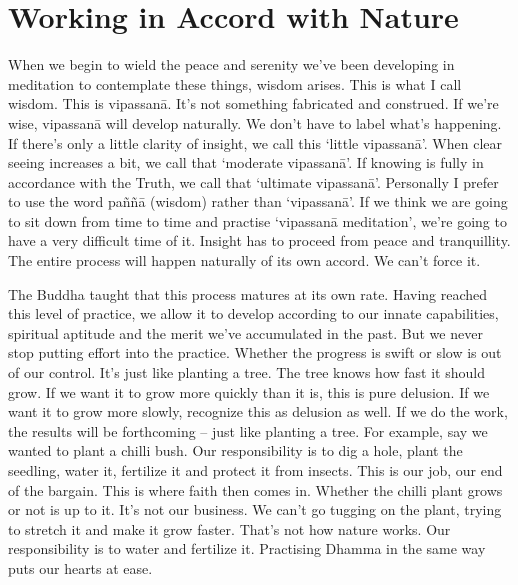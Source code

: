 \section*{Working in Accord with Nature}

When we begin to wield the peace and serenity we've been developing in meditation to contemplate these things, wisdom arises. This is what I call wisdom. This is vipassan\=a. It's not something fabricated and construed. If we're wise, vipassan\=a will develop naturally. We don't have to label what's happening. If there's only a little clarity of insight, we call this `little vipassan\=a'. When clear seeing increases a bit, we call that `moderate vipassan\=a'. If knowing is fully in accordance with the Truth, we call that `ultimate vipassan\=a'. Personally I prefer to use the word pa\~n\~n\=a (wisdom) rather than `vipassan\=a'. If we think we are going to sit down from time to time and practise `vipassan\=a meditation', we're going to have a very difficult time of it. Insight has to proceed from peace and tranquillity. The entire process will happen naturally of its own accord. We can't force it.

The Buddha taught that this process matures at its own rate. Having reached this level of practice, we allow it to develop according to our innate capabilities, spiritual aptitude and the merit we've accumulated in the past. But we never stop putting effort into the practice. Whether the progress is swift or slow is out of our control. It's just like planting a tree. The tree knows how fast it should grow. If we want it to grow more quickly than it is, this is pure delusion. If we want it to grow more slowly, recognize this as delusion as well. If we do the work, the results will be forthcoming -- just like planting a tree. For example, say we wanted to plant a chilli bush. Our responsibility is to dig a hole, plant the seedling, water it, fertilize it and protect it from insects. This is our job, our end of the bargain. This is where faith then comes in. Whether the chilli plant grows or not is up to it. It's not our business. We can't go tugging on the plant, trying to stretch it and make it grow faster. That's not how nature works. Our responsibility is to water and fertilize it. Practising Dhamma in the same way puts our hearts at ease.

